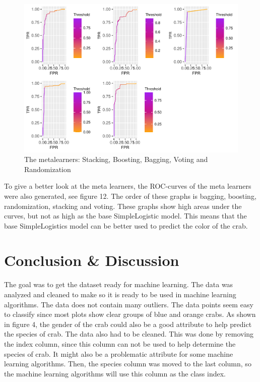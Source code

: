 \documentclass[
]{article}
\begin{document}
\begin{figure}[H]

{\centering \includegraphics{CrabProject_files/figure-latex/unnamed-chunk-2-1} 

}

\caption{The metalearners: Stacking, Boosting, Bagging, Voting and Randomization}\label{fig:unnamed-chunk-2}
\end{figure}

To give a better look at the meta learners, the ROC-curves of the meta
learners were also generated, see figure 12. The order of these graphs
is bagging, boosting, randomization, stacking and voting. These graphs
show high areas under the curves, but not as high as the base
SimpleLogistic model. This means that the base SimpleLogistics model can
be better used to predict the color of the crab. \newpage

\hypertarget{conclusion-discussion}{%
\section{Conclusion \& Discussion}\label{conclusion-discussion}}

The goal was to get the dataset ready for machine learning. The data was
analyzed and cleaned to make so it is ready to be used in machine
learning algorithms. The data does not contain many outliers. The data
points seem easy to classify since most plots show clear groups of blue
and orange crabs. As shown in figure 4, the gender of the crab could
also be a good attribute to help predict the species of crab. The data
also had to be cleaned. This was done by removing the index column,
since this column can not be used to help determine the species of crab.
It might also be a problematic attribute for some machine learning
algorithms. Then, the species column was moved to the last column, so
the machine learning algorithms will use this column as the class index.
\end{document}
